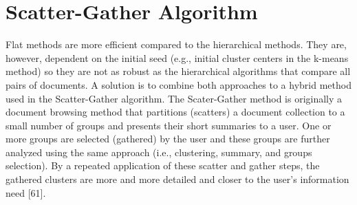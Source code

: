 \documentclass[11pt,openany,executivepaper]{book}
\begin{document}


\section{Scatter-Gather Algorithm}
Flat methods are more efficient compared to the hierarchical methods. They are, however, dependent on the initial seed (e.g., initial cluster centers in the k-means method) so they are not as robust as the hierarchical algorithms that compare all pairs of documents. A solution is to combine both approaches to a hybrid method used in the Scatter-Gather algorithm. The Scater-Gather method is originally a document browsing method that partitions (scatters) a document collection to a small number of groups and presents their short summaries to a user. One or more groups are selected (gathered) by the user and these groups are further analyzed
using the same approach (i.e., clustering, summary, and groups selection). By a repeated application of these scatter and gather steps, the gathered clusters are more and more detailed and closer to the user’s information need [61].
\end{document}
